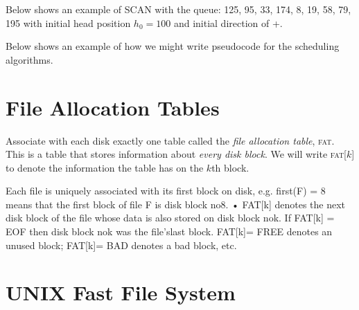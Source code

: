 \begin{example}
Below shows an example of SCAN with the queue: 125, 95, 33, 174, 8, 19, 58, 79, 195
with initial head position $h_0 = 100$ and initial direction of +. 

\end{example}




\frmrule

Below shows an example of how we might write pseudocode for the scheduling algorithms.


\section{File Allocation Tables}

Associate with each disk exactly one table 
called the \textit{file allocation table}, \textsc{fat}.
This is a table that stores information about \textit{every disk block}. 
We will write \textsc{fat}[$k$] to denote the information the table has on the $k$th block.

Each file is uniquely associated with its ﬁrst block
on disk, e.g. ﬁrst(F) = 8 means that the ﬁrst block
of ﬁle F is disk block no8.
• FAT[k] denotes the next disk block of the ﬁle whose
data is also stored on disk block nok.
If FAT[k] = EOF then disk block nok was the ﬁle’slast block.
FAT[k]= FREE denotes an unused block; FAT[k]=
BAD denotes a bad block, etc.


\section{UNIX Fast File System}

